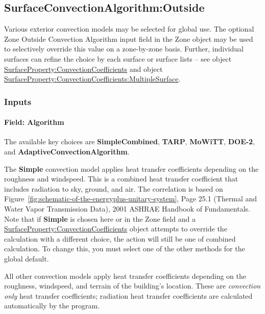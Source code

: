 \subsection{SurfaceConvectionAlgorithm:Outside}\label{surfaceconvectionalgorithmoutside}

Various exterior convection models may be selected for global use. The optional Zone Outside Convection Algorithm input field in the Zone object may be used to selectively override this value on a zone-by-zone basis. Further, individual surfaces can refine the choice by each surface or surface lists -- see object \hyperref[surfacepropertyconvectioncoefficients]{SurfaceProperty:ConvectionCoefficients} and object \hyperref[surfacepropertyconvectioncoefficientsmultiplesurface]{SurfaceProperty:ConvectionCoefficients:MultipleSurface}.

\subsubsection{Inputs}\label{inputs-5-028}

\paragraph{Field: Algorithm}\label{field-algorithm-1-000}

The available key choices are \textbf{SimpleCombined}, \textbf{TARP}, \textbf{MoWiTT}, \textbf{DOE-2}, and \textbf{AdaptiveConvectionAlgorithm}.

The \textbf{Simple} convection model applies heat transfer coefficients depending on the roughness and windspeed. This is a combined heat transfer coefficient that includes radiation to sky, ground, and air. The correlation is based on Figure~\ref{fig:schematic-of-the-energyplus-unitary-system}, Page 25.1 (Thermal and Water Vapor Transmission Data), 2001 ASHRAE Handbook of Fundamentals. Note that if \textbf{Simple} is chosen here or in the Zone field and a \hyperref[surfacepropertyconvectioncoefficients]{SurfaceProperty:ConvectionCoefficients} object attempts to override the calculation with a different choice, the action will still be one of combined calculation. To change this, you must select one of the other methods for the global default.

All other convection models apply heat transfer coefficients depending on the roughness, windspeed, and terrain of the building's location. These are \emph{convection only} heat transfer coefficients; radiation heat transfer coefficients are calculated automatically by the program.

